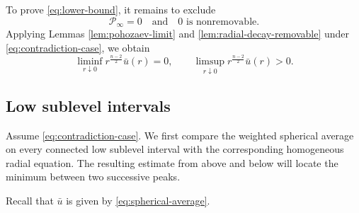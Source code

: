 \documentclass[11pt]{article}
\numberwithin{equation}{section}
\theoremstyle{remark}
\newcommand{\cP}{\mathcal P}
\begin{document}
\par
To prove \eqref{eq:lower-bound}, it remains to exclude
\begin{equation}\label{eq:contradiction-case}
 \cP_\infty=0
 \quad\text{and}\quad
 0\text{ is nonremovable}.
\end{equation}
{Applying Lemmas  \ref{lem:pohozaev-limit} and
\ref{lem:radial-decay-removable} under
\eqref{eq:contradiction-case}, we obtain}
\begin{equation}\label{eq:radial-oscillation}
 \liminf_{r\downarrow0}r^{\frac{n-2}{2}}\bar u(r)=0,
 \qquad
 \limsup_{r\downarrow0}r^{\frac{n-2}{2}}\bar u(r)>0.
\end{equation}

\subsection{Low sublevel intervals}

{
Assume \eqref{eq:contradiction-case}.  We first compare the weighted
spherical average on every connected low sublevel interval with the
corresponding homogeneous radial equation.  The resulting
estimate from above and below will locate the minimum between two
successive peaks.
}

{Recall that \(\bar u\) is given by
\eqref{eq:spherical-average}.}
\end{document}
